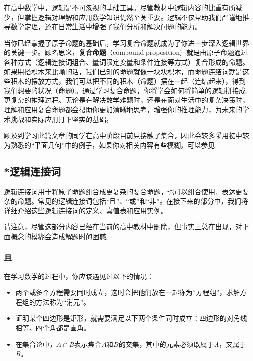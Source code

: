 
\begin{issues}
\issueDraft
\end{issues}



在高中数学中，逻辑是不可忽视的基础工具。尽管教材中逻辑内容的比重有所减少，但掌握逻辑对理解和应用数学知识仍然至关重要。逻辑不仅帮助我们严谨地推导数学定理，还在日常生活中增强了我们分析和解决问题的能力。

当你已经掌握了原子命题的基础后，学习复合命题就成为了你进一步深入逻辑世界的关键一步。顾名思义，\textbf{复合命题}（compound proposition）就是由原子命题通过各种方式（逻辑连接词组合、量词限定变量和条件连接等方式）复合形成的命题。如果用搭积木来比喻的话，我们已知的命题就像一块块积木，而命题连结词就是这些积木的摆放方式，我们可以把不同的积木（命题）摆在一起（连结起来），得到我们想要的状况（命题）。通过学习复合命题，你将学会如何将简单的逻辑拼接成更复杂的推理过程。无论是在解决数学难题时，还是在面对生活中的复杂决策时，理解和应用复合命题都会帮助你更加清晰地思考，增强你的推理能力，为未来的学术挑战和实际应用打下坚实的基础。

顾及到学习此篇文章的同学在高中阶段目前只接触了集合，因此会较多采用初中较为熟悉的“平面几何”中的例子，如果你对相关内容有些模糊，可以参见

\subsection{*逻辑连接词}

逻辑连接词用于将原子命题组合成更复杂的复合命题，也可以组合使用，表达更复杂的命题。常见的逻辑连接词包括“且”、“或”和“非”。在接下来的部分中，我们将详细介绍这些逻辑连接词的定义、真值表和应用实例。

请注意，尽管这部分内容已经在当前的高中教材中删除，但事实上总在出现，对下面概念的模糊会造成解题时的困惑。

\subsubsection{且}

在学习数学的过程中，你应该遇见过以下的情况：
\begin{itemize}
\item 两个或多个方程需要同时成立，这时会把他们放在一起称为“方程组”，求解方程组的方法称为“消元”。
\item 证明某个四边形是矩形，就需要满足以下两个条件同时成立：四边形的对角线相等、四个角都是直角。
\item 在集合论中，$A \cap B$表示集合$A$和$B$的交集，其中的元素必须既属于$A$，又属于$B$。
\end{itemize}

